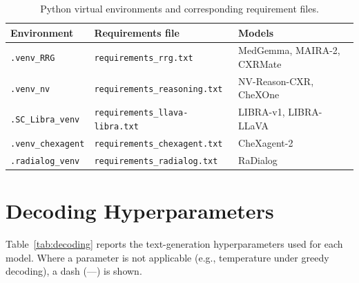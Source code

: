 \documentclass[10pt,a4paper]{article}
\newcommand{\na}{---}
\begin{document}
\begin{table}[ht]
\centering
\caption{Python virtual environments and corresponding requirement files.}
\label{tab:venvs}
\small
\begin{tabular}{L{3.0cm} L{4.5cm} L{4.5cm}}
\toprule
\textbf{Environment} & \textbf{Requirements file} & \textbf{Models} \\
\midrule
\texttt{.venv\_RRG}       & \texttt{requirements\_rrg.txt}         & MedGemma, MAIRA-2, CXRMate \\
\texttt{.venv\_nv}        & \texttt{requirements\_reasoning.txt}   & NV-Reason-CXR, CheXOne \\
\texttt{.SC\_Libra\_venv} & \texttt{requirements\_llava-libra.txt} & LIBRA-v1, LIBRA-LLaVA \\
\texttt{.venv\_chexagent} & \texttt{requirements\_chexagent.txt}   & CheXagent-2 \\
\texttt{.radialog\_venv}  & \texttt{requirements\_radialog.txt}    & RaDialog \\
\bottomrule
\end{tabular}
\end{table}

\section{Decoding Hyperparameters}
\label{sec:decoding}

Table~\ref{tab:decoding} reports the text-generation hyperparameters
used for each model.
Where a parameter is not applicable (e.g., temperature under greedy
decoding), a dash (\na) is shown.
\end{document}
